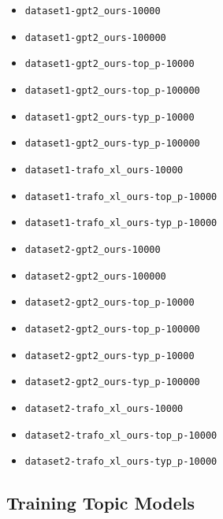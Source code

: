 \begin{multicols}{2}{\footnotesize
\begin{itemize}
    \item \texttt{dataset1-gpt2\_ours-10000}
    \item \texttt{dataset1-gpt2\_ours-100000}
    \item \texttt{dataset1-gpt2\_ours-top\_p-10000}
    \item \texttt{dataset1-gpt2\_ours-top\_p-100000}
    \item \texttt{dataset1-gpt2\_ours-typ\_p-10000}
    \item \texttt{dataset1-gpt2\_ours-typ\_p-100000}
    \item \texttt{dataset1-trafo\_xl\_ours-10000}
    \item \texttt{dataset1-trafo\_xl\_ours-top\_p-10000}
    \item \texttt{dataset1-trafo\_xl\_ours-typ\_p-10000}
    \item \texttt{dataset2-gpt2\_ours-10000}
    \item \texttt{dataset2-gpt2\_ours-100000}
    \item \texttt{dataset2-gpt2\_ours-top\_p-10000}
    \item \texttt{dataset2-gpt2\_ours-top\_p-100000}
    \item \texttt{dataset2-gpt2\_ours-typ\_p-10000}
    \item \texttt{dataset2-gpt2\_ours-typ\_p-100000}
    \item \texttt{dataset2-trafo\_xl\_ours-10000}
    \item \texttt{dataset2-trafo\_xl\_ours-top\_p-10000}
    \item \texttt{dataset2-trafo\_xl\_ours-typ\_p-10000}
\end{itemize}}
\end{multicols}

\subsection{Training Topic Models}

